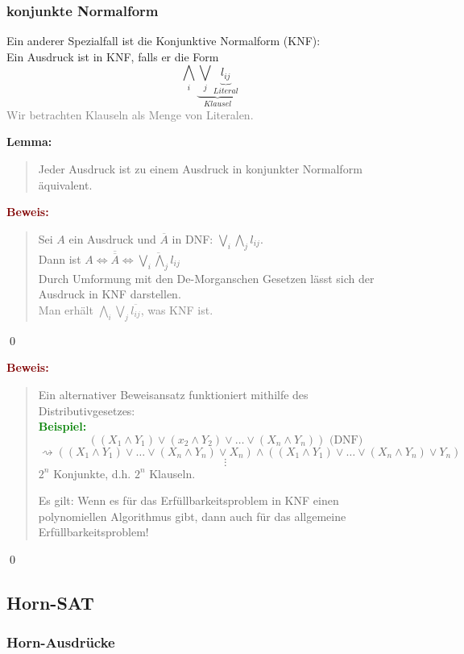 \documentclass{article}
\newcommand{\gray}[1]{\textcolor{gray}{#1}}
\newcommand{\green}[1]{\textcolor{green}{#1}}
\newcommand{\dgr}[1]{\textcolor{dgr}{#1}}
\newcommand{\maroon}[1]{\textcolor{maroon}{#1}}
\newcommand{\ex}{\green{\textbf{Beispiel: }}}
\newcommand{\lem}[1]{\dgr{\textbf{Lemma: }}\begin{quote}#1\end{quote}}
\newcommand{\pr}[1]{\maroon{\textbf{Beweis: }}\begin{quote}#1\end{quote}\qed}
\newcommand{\n}[1]{\overline{#1}}
\begin{document}
\subsubsection{konjunkte Normalform}

Ein anderer Spezialfall ist die Konjunktive Normalform (KNF):\\
Ein Ausdruck ist in KNF, falls er die Form
\[
    \bigwedge_i \underbrace{\bigvee_j \underbrace{l_{ij}}_{Literal}}_{Klausel}
\]
\gray{Wir betrachten Klauseln als Menge von Literalen.}

\lem{Jeder Ausdruck ist zu einem Ausdruck in konjunkter Normalform äquivalent.}
\pr{
    Sei $A$ ein Ausdruck und \(\n{A}\) in DNF: \(\bigvee_i \bigwedge_j l_{ij}\).\\
    Dann ist \(A \iff \n{\n{A}} \iff \n{\bigvee_i \bigwedge_j l_{ij}}\)\\
    Durch Umformung mit den De-Morganschen Gesetzen lässt sich der Ausdruck in KNF darstellen.\\
    \gray{Man erhält \(\bigwedge_i \bigvee_j \n{l_{ij}}\), was KNF ist.}
}

\newpage
\pr{
    Ein alternativer Beweisansatz funktioniert mithilfe des\\ Distributivgesetzes:\\
    \ex
    \[
        ((X_1 \land Y_1) \lor (x_2 \land Y_2) \lor \dots \lor (X_n \land Y_n)) \text{ (DNF)}
    \]
    \[
        \rightsquigarrow ((X_1 \land Y_1) \lor \dots \lor (X_n \land Y_n) \lor X_n) \land ((X_1 \land Y_1) \lor \dots \lor (X_n \land Y_n) \lor Y_n)
    \]
    \[\vdots\]
    \(2^n\) Konjunkte, d.h. \(2^n\) Klauseln.

    Es gilt: Wenn es für das Erfüllbarkeitsproblem in KNF einen\\
    polynomiellen Algorithmus gibt, dann auch für das allgemeine\\
    Erfüllbarkeitsproblem!
}

\subsection{Horn-SAT}

\subsubsection{Horn-Ausdrücke}
\end{document}
